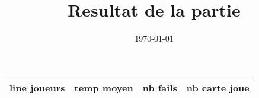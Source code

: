 \documentclass[10pt,a4paper]{article}
\title{Resultat de la partie}
\date{\today}
\begin{document}
\maketitle
\begin{tabular}{|R{2cm}||C{1cm}|L{1.5cm}|L{1.5cm}|}
\hline
line joueurs & temp moyen &  nb fails & nb carte joue   \\

\hline
\end{tabular}
\end{document}
